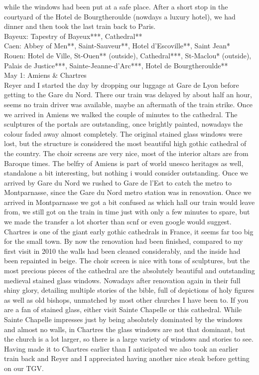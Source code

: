 while the windows had been put at a safe place. After a short stop in the courtyard of the Hotel de Bourgtheroulde (nowdays a luxury hotel), we had dinner and then took the last train back to Paris.\\

Bayeux: Tapestry of Bayeux***, Cathedral**\\
Caen: Abbey of Men**, Saint-Sauveur**, Hotel d'Escoville**, Saint Jean*\\
Rouen: Hotel de Ville, St-Ouen** (outside), Cathedral***, St-Maclou* (outside), Palais de Justice***, Sainte-Jeanne-d'Arc***, Hotel de Bourgtheroulde**\\

May 1: Amiens \& Chartres\\
Reyer and I started the day by dropping our luggage at Gare de Lyon before getting to the Gare du Nord. There our train was delayed by about half an hour, seems no train driver was available, maybe an aftermath of the train strike. Once we arrived in Amiens we walked the couple of minutes to the cathedral. The sculptures of the portals are outstanding, once brightly painted, nowadays the colour faded away almost completely. The original stained glass windows were lost, but the structure is considered the most beautiful high gothic cathedral of the country. The choir screens are very nice, most of the interior altars are from Baroque times. The belfry of Amiens is part of world unesco heritages as well, standalone a bit interesting, but nothing i would consider outstanding. Once we arrived by Gare du Nord we rushed to Gare de l'Est to catch the metro to Montparnasse, since the Gare du Nord metro station was in renovation. Once we arrived in Montparnasse we got a bit confused as which hall our train would leave from, we still got on the train in time just with only a few minutes to spare, but we made the transfer a lot shorter than scnf or even google would suggest. Chartres is one of the giant early gothic cathedrals in France, it seems far too big for the small town. By now the renovation had been finished, compared to my first visit in 2010 the walls had been cleaned considerably, and the inside had been repainted in beige. The choir screen is nice with tons of sculptures, but the most precious pieces of the cathedral are the absolutely beautiful and outstanding medieval stained glass windows. Nowadays after renovation again in their full shiny glory, detailing multiple stories of the bible, full of depictions of holy figures as well as old bishops, unmatched by most other churches I have been to. If you are a fan of stained glass, either visit Sainte Chapelle or this cathedral. While Sainte Chapelle impresses just by being absolutely dominated by the windows and almost no walls, in Chartres the glass windows are not that dominant, but the church is a lot larger, so there is a large variety of windows and stories to see. Having made it to Chartres earlier than I anticipated we also took an earlier train back and Reyer and I appreciated having another nice steak before getting on our TGV.\\

